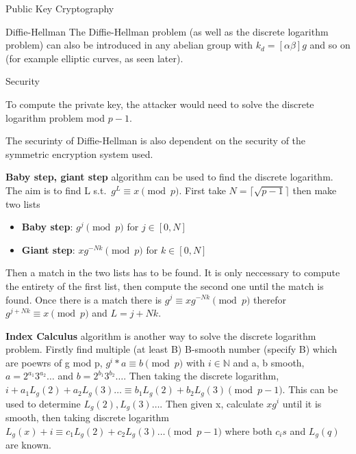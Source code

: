 \documentclass[12pt, letterpaper]{article}
\begin{document}
\begin{section}{Public Key Cryptography}
\begin{subsection}{Diffie-Hellman}
    The Diffie-Hellman problem (as well as the discrete logarithm problem) can
    also be introduced in any abelian group with \(k_{d} = [\alpha \beta] g\)
    and so on (for example elliptic curves, as seen later).

    \begin{subsubsection}{Security}

      To compute the private key, the attacker would need to solve the discrete
      logarithm problem mod \(p - 1\).

      The securinty of Diffie-Hellman is also dependent on the security of the
      symmetric encryption system used.

      \textbf{Baby step, giant step}
      algorithm can be used to find the discrete logarithm. The aim is to find
      L s.t.\ \(g^{L} \equiv x \pmod{p}\).
      First take \(N = \lceil \sqrt{p - 1} \rceil\) then make two lists
      \begin{itemize}
        \item \textbf{Baby step}: \(g^{j} \pmod{p}\) for \(j \in [0, N]\)
        \item \textbf{Giant step}: \(xg^{-Nk} \pmod{p}\) for \(k \in [0, N]\)
      \end{itemize}
      Then a match in the two lists has to be found. It is only neccessary to
      compute the entirety of the first list, then compute the second one until
      the match is found. Once there is a match there is \(g^{j} \equiv
      xg^{-Nk} \pmod{p}\) therefor \(g^{j + Nk} \equiv x \pmod{p}\) and
      \(L = j + Nk\).

      \textbf{Index Calculus}
      algorithm is another way to solve the discrete logarithm problem. Firstly
      find multiple (at least B)  B-smooth number (specify B) which are
      poewrs of g mod p, \(g^{i} * a \equiv b \pmod{p}\) with \(i \in
      \mathbb{N}\) and a, b smooth, \(a = 2^{a_{1}} 3^{a_{2}} \dots\) and
      \(b = 2^{b_{1}} 3^{b_{2}} \dots\). Then taking the discrete logarithm,
      \(i + a_{1} L_{g}(2) + a_{2} L_{g}(3) \dots \equiv b_{1} L_{g}(2) +
      b_{2} L_{g}(3) \pmod{p - 1}\). This can be used to determine \(L_{g}(2),
      L_{g}(3) \dots\). Then given x, calculate \(xg^{i}\) until it is smooth,
      then taking discrete logarithm \(L_{g}(x) + i \equiv c_{1} L_{g}(2) +
      c_{2} L_{g}(3) \dots \pmod{p - 1}\) where both \(c_{i}s\) and
      \(L_{g}(q)\) are known.

    \end{subsubsection}


\end{subsection}
\end{section}
\end{document}
